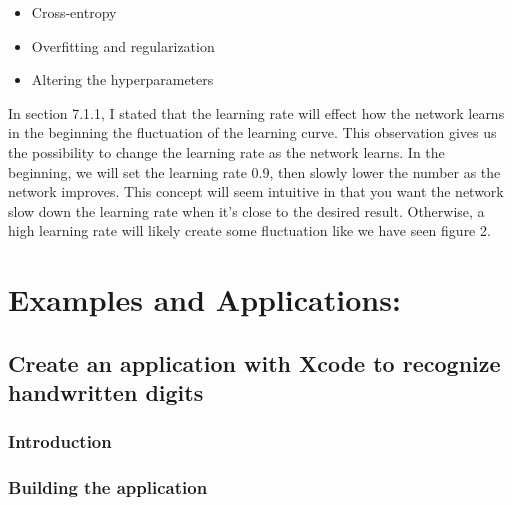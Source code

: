 \documentclass[]{article}
\begin{document}
\begin{multicols}{2}
\begin{itemize}
	\item Cross-entropy
	\item Overfitting and regularization
	\item Altering the hyperparameters
\end{itemize}

In section 7.1.1, I stated that the learning rate will effect how the network learns in the beginning the fluctuation of the learning curve. This observation gives us the possibility to change the learning rate as the network learns. In the beginning, we will set the learning rate 0.9, then slowly lower the number as the network improves. 
This concept will seem intuitive in that you want the network slow down the learning rate when it's close to the desired result. Otherwise, a high learning rate will likely create some fluctuation like we have seen figure 2. 

\section{Examples and Applications:}
\lipsum[4]
\subsection{Create an application with Xcode to recognize handwritten digits}
\lipsum[4]
\subsubsection{Introduction}
\lipsum[4]
\subsubsection{Building the application}
\lipsum[4]

\end{multicols}
\end{document}
